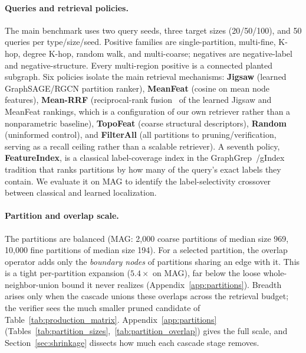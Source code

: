 \documentclass{article}
\begin{document}
\paragraph{Queries and retrieval policies.}
The main benchmark uses two query seeds, three target sizes (20/50/100), and 50 queries per type/size/seed. Positive families are single-partition, multi-fine, K-hop, degree K-hop, random walk, and multi-coarse; negatives are negative-label and negative-structure. Every multi-region positive is a connected planted subgraph. Six policies isolate the main retrieval mechanisms: \textbf{Jigsaw} (learned GraphSAGE/RGCN partition ranker), \textbf{MeanFeat} (cosine on mean node features), \textbf{Mean-RRF} (reciprocal-rank fusion~\cite{ref_rrf} of the learned Jigsaw and MeanFeat rankings, which is a configuration of our own retriever rather than a nonparametric baseline), \textbf{TopoFeat} (coarse structural descriptors), \textbf{Random} (uninformed control), and \textbf{FilterAll} (all partitions to pruning/verification, serving as a recall ceiling rather than a scalable retriever). A seventh policy, \textbf{FeatureIndex}, is a classical label-coverage index in the GraphGrep~\cite{ref_graphgrep}/gIndex~\cite{ref_gindex} tradition that ranks partitions by how many of the query's exact labels they contain. We evaluate it on MAG to identify the label-selectivity crossover between classical and learned localization.

\paragraph{Partition and overlap scale.}
The partitions are balanced (MAG: 2{,}000 coarse partitions of median size 969, 10{,}000 fine partitions of median size 194). For a selected partition, the overlap operator adds only the \emph{boundary nodes} of partitions sharing an edge with it. This is a tight per-partition expansion ($5.4\times$ on MAG), far below the loose whole-neighbor-union bound it never realizes (Appendix~\ref{app:partitions}). Breadth arises only when the cascade unions these overlaps across the retrieval budget; the verifier sees the much smaller pruned candidate of Table~\ref{tab:production_matrix}. Appendix~\ref{app:partitions} (Tables~\ref{tab:partition_sizes},~\ref{tab:partition_overlap}) gives the full scale, and Section~\ref{sec:shrinkage} dissects how much each cascade stage removes.
\end{document}
